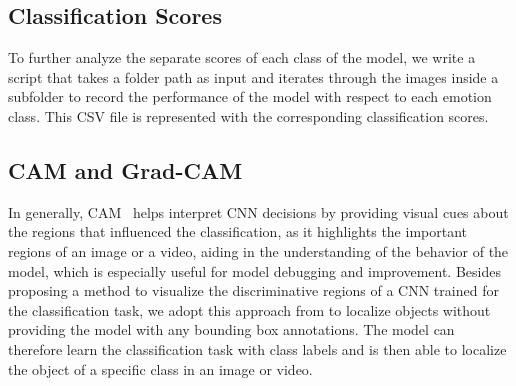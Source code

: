 \subsection{Classification Scores}
\label{sec:optim:csv}
To further analyze the separate scores of each class of the model, 
we write a script that takes a folder path as input and iterates through the images inside a subfolder to record the performance of the model with respect to each emotion class. 
This CSV file is represented with the corresponding classification scores. 

\subsection{CAM and Grad-CAM} %
\label{sec:optim:cam}

In generally, 
CAM~\cite{ZhouKLOT16} helps interpret CNN decisions by providing visual cues about the regions that influenced the classification, 
as it highlights the important regions of an image or a video, 
aiding in the understanding of the behavior of the model, 
which is especially useful for model debugging and improvement. 
Besides proposing a method to visualize the discriminative regions of a CNN trained for the classification task, %
we adopt this approach from \citet{ZhouKLOT16} to localize objects without providing the model with any bounding box annotations. 
The model can therefore learn the classification task with class labels and is then able to localize the object of a specific class in an image or video. 

